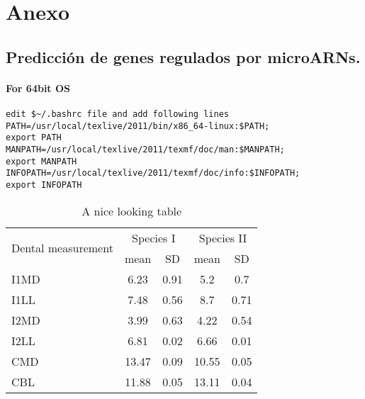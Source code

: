 \chapter{Anexo} 

\section*{Predicción de genes regulados por microARNs.}

\subsubsection*{For 64bit OS}
\begin{verbatim}
edit $~/.bashrc file and add following lines
PATH=/usr/local/texlive/2011/bin/x86_64-linux:$PATH;
export PATH 
MANPATH=/usr/local/texlive/2011/texmf/doc/man:$MANPATH;
export MANPATH 
INFOPATH=/usr/local/texlive/2011/texmf/doc/info:$INFOPATH;
export INFOPATH

\end{verbatim}


\begin{table}
\caption{A nice looking table}
\centering
\label{table:nice_table}
\begin{tabular}{l c c c c}
\hline 
\multirow{2}{*}{Dental measurement} & \multicolumn{2}{c}{Species I} & \multicolumn{2}{c}{Species II} \\ 
\cline{2-5}
  & mean & SD  & mean & SD  \\ 
\hline
I1MD & 6.23 & 0.91 & 5.2  & 0.7  \\

I1LL & 7.48 & 0.56 & 8.7  & 0.71 \\

I2MD & 3.99 & 0.63 & 4.22 & 0.54 \\

I2LL & 6.81 & 0.02 & 6.66 & 0.01 \\

CMD & 13.47 & 0.09 & 10.55 & 0.05 \\

CBL & 11.88 & 0.05 & 13.11 & 0.04\\ 
\hline 
\end{tabular}
\end{table}




